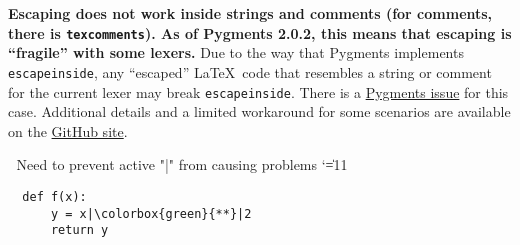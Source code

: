 \begin{optionlist}
\textbf{Escaping does not work inside strings and comments (for comments, there is \texttt{texcomments}).  As of Pygments 2.0.2, this means that escaping is ``fragile'' with some lexers.}  Due to the way that Pygments implements \texttt{escapeinside}, any ``escaped'' \LaTeX\ code that resembles a string or comment for the current lexer may break \texttt{escapeinside}.  There is a \href{https://bitbucket.org/birkenfeld/pygments-main/issue/1118}{Pygments issue} for this case.  Additional details and a limited workaround for some scenarios are available on the \href{https://github.com/gpoore/minted/issues/70#issuecomment-111729930}{ GitHub site}.

\begingroup  ^^A Need to prevent active "|" from causing problems
\catcode`\|=11
\begin{example}
  \begin{verbatim}
  def f(x):
      y = x|\colorbox{green}{**}|2
      return y
  \end{verbatim}
\end{example}
\endgroup


\end{optionlist}
